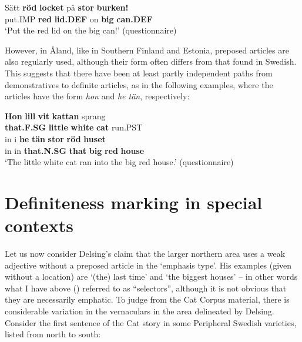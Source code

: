 \ea\label{}
\gll Sätt  \textbf{röd} \textbf{locket} på  \textbf{stor} \textbf{burken!}\\
put.IMP  \textbf{red} \textbf{lid.DEF} on  \textbf{big} \textbf{can.DEF}\\
\glt ‘Put the red lid on the big can!’ (questionnaire)
\z

However, in Åland, like in Southern Finland and Estonia, preposed articles are also regularly used, although their form often differs from that found in Swedish. This suggests that there have been at least partly independent paths from demonstratives to definite articles, as in the following examples, where the articles have the form \textit{hon} and \textit{he tän}, respectively:

\ea\label{}
\gll \textbf{Hon} \textbf{lill} \textbf{vit} \textbf{kattan} sprang\\
\textbf{that.F.SG} \textbf{little} \textbf{white} \textbf{cat} run.PST\\
\gll in  i  \textbf{he} \textbf{tän} \textbf{stor} \textbf{röd} \textbf{huset} \\
in  in  \textbf{that.N.SG} \textbf{that} \textbf{big} \textbf{red} \textbf{house} \\
\glt  ‘The little white cat ran into the big red house.’ (questionnaire)
\z

\section{Definiteness marking in special contexts}

Let us now consider Delsing’s claim that the larger northern area uses a weak adjective without a preposed article in the ‘emphasis type’. His examples (given without a location) are  ‘(the) last time’ and  ‘the biggest houses’ – in other words what I have above () referred to as “selectors”, although it is not obvious that they are necessarily emphatic. To judge from the Cat Corpus material, there is considerable variation in the vernaculars in the area delineated by Delsing. Consider the first sentence of the Cat story in some Peripheral Swedish varieties, listed from north to south:

